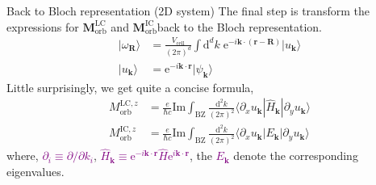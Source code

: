 \documentclass{beamer}
\newcommand{\purple}{\textcolor{purple}}
\begin{document}

    \begin{frame}{Back to Bloch representation (2D system)}
      The final step is transform the expressions for \(\bm{M}_{\text{orb}}^{\text{LC}}\) and \(\bm{M}_{\text{orb}}^{\text{IC}}\)back to the Bloch representation. 
      \begin{subequations}\begin{align}
        |\omega_{\bm{R}}\rangle &= \frac{V_{\text{cell}}}{(2\pi)^d}\int\mathrm{d}^dk\; \mathrm{e}^{-i\bm{k}\cdot(\bm{r}-\bm{R})}|u_{\bm{k}}\rangle\\
        |u_{\bm{k}}\rangle &= \mathrm{e}^{-i\bm{k}\cdot\bm{r}}|\psi_{\bm{k}}\rangle
      \end{align}\end{subequations}
      Little surprisingly, we get quite a concise formula,
      \begin{subequations}\begin{align}
        M_{\text{orb}}^{\text{LC}, z} &= \frac{e}{\hbar{}c}\text{Im}\int_{\text{BZ}}\frac{\mathrm{d}^2k}{(2\pi)^2}\langle\partial_xu_{\bm{k}}|\widehat{H}_{\bm{k}}|\partial_yu_{\bm{k}}\rangle\\
        M_{\text{orb}}^{\text{IC}, z} &= \frac{e}{\hbar{}c}\text{Im}\int_{\text{BZ}}\frac{\mathrm{d}^2k}{(2\pi)^2}\langle\partial_xu_{\bm{k}}|E_{\bm{k}}|\partial_yu_{\bm{k}}\rangle
      \end{align}\end{subequations}
      where, \purple{\(\partial_i \equiv \partial/\partial{}k_i\)}, \purple{\(\widehat{H}_{\bm{k}} \equiv \mathrm{e}^{-i\bm{k}\cdot\bm{r}}\widehat{H}\mathrm{e}^{i\bm{k}\cdot\bm{r}}\)}, the \purple{\(E_{\bm{k}}\)} denote the corresponding eigenvalues.
    \end{frame}
\end{document}
